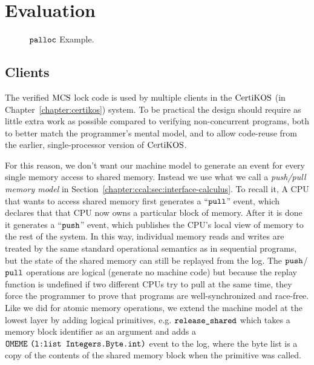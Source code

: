 
\section{Evaluation}
\label{sec:evaluation}

\begin{figure}
\begin{minipage}{\linewidth}
\noindent
\begin{multicols}{2}


\end{multicols}
\end{minipage}
\caption{${\mathrm{\texttt{palloc}}}$ Example.}
\label{fig:chapter:mcslock:palloc-example}
\end{figure}

\subsection{Clients}

The verified $\mathrm{MCS}$ lock code is used by multiple clients in the $\mathrm{CertiKOS}$ (in Chapter~\ref{chapter:certikos})
system. To be practical the design should require as little extra work
as possible compared to verifying non-concurrent programs, both to
better match the programmer's mental model, and to allow code-reuse
from the earlier, single-processor version of $\mathrm{CertiKOS}$.

For this reason, we don't want our machine model to generate an event
for every single memory access to shared memory. Instead we use what
we call a \emph{push/pull memory model} in Section~\ref{chapter:ccal:sec:interface-calculus}.
To recall it,
 A CPU that wants to access shared memory first generates a ``${\mathrm{\texttt{pull}}}$''
event, which declares that that CPU now owns a particular block of
memory. After it is done it generates a ``${\mathrm{\texttt{push}}}$'' event, which
publishes the CPU's local view of memory to the rest of the system. In
this way, individual memory reads and writes are treated by the same
standard operational semantics as in sequential programs, but the
state of the shared memory can still be replayed from the log.  The
${\mathrm{\texttt{push}}}$/${\mathrm{\texttt{pull}}}$ operations are logical (generate no machine code) but
because the replay function is undefined if two different CPUs try to
pull at the same time, they force the programmer to prove that
programs are well-synchronized and race-free. Like we did for atomic
memory operations, we extend the machine model at the lowest layer by
adding logical primitives, e.g. ${\mathrm{\texttt{release\_shared}}}$ which takes a
memory block identifier as an argument and adds a
${\mathrm{\texttt{OMEME}}}~{{\mathrm{\texttt{(l:list Integers.Byte.int)}}}}$ event to the log, where the byte list is a
copy of the contents of the shared memory block when the primitive was
called.


